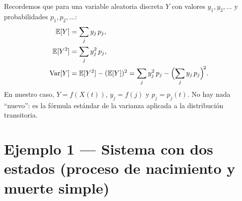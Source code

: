 \documentclass[11pt,a4paper]{article}
\theoremstyle{definition}
\theoremstyle{remark}
\newcommand{\E}{\mathbb{E}}
\newcommand{\Var}{\mathrm{Var}}
\begin{document}
\begin{cajanota}
Recordemos que para una variable aleatoria discreta $Y$ con valores
$y_1,y_2,\dots$ y probabilidades $p_1,p_2,\dots$:
\begin{align*}
  \E[Y]   &= \sum_j y_j\,p_j, \\
  \E[Y^2] &= \sum_j y_j^2\,p_j, \\
  \Var[Y]  &= \E[Y^2] - (\E[Y])^2
            = \sum_j y_j^2\,p_j - \Bigl(\sum_j y_j\,p_j\Bigr)^{\!2}.
\end{align*}
En nuestro caso, $Y = f(X(t))$, $y_j = f(j)$ y $p_j = p_j(t)$.  No hay
nada ``nuevo'': es la fórmula estándar de la varianza aplicada a la
distribución transitoria.
\end{cajanota}

\section{Ejemplo 1 --- Sistema con dos estados (proceso de nacimiento y muerte simple)}
\end{document}
